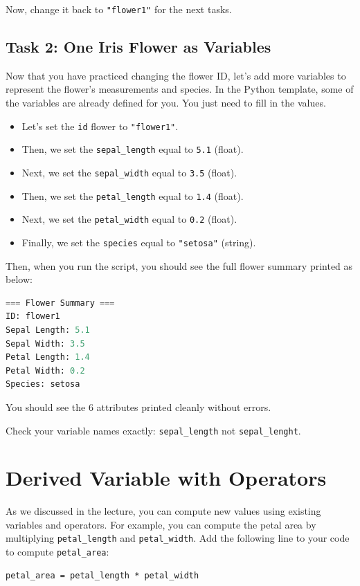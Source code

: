 Now, change it back to \texttt{"flower1"} for the next tasks.

\subsection{Task 2: One Iris Flower as Variables}
Now that you have practiced changing the flower ID, let's add more variables to represent the flower's measurements and species. In the Python template, some of the variables are already defined for you. You just need to fill in the values.
\begin{itemize}
    \item Let's set the \texttt{id} flower to \texttt{"flower1"}.
    \item Then, we set the \texttt{sepal\_length} equal to \texttt{5.1} (float).
    \item Next, we set the \texttt{sepal\_width} equal to \texttt{3.5} (float).
    \item Then, we set the \texttt{petal\_length} equal to \texttt{1.4} (float).
    \item Next, we set the \texttt{petal\_width} equal to \texttt{0.2} (float).
    \item Finally, we set the \texttt{species} equal to \texttt{"setosa"} (string).
\end{itemize}

Then, when you run the script, you should see the full flower summary printed as below:
\begin{lstlisting}[language=Python]
=== Flower Summary ===
ID: flower1
Sepal Length: 5.1
Sepal Width: 3.5
Petal Length: 1.4
Petal Width: 0.2
Species: setosa
\end{lstlisting}

\begin{tcolorbox}[title=Checkpoint]
You should see the 6 attributes printed cleanly without errors.
\end{tcolorbox}
\begin{tcolorbox}[title=Common Mistakes]
Check your variable names exactly: \texttt{sepal\_length} not \texttt{sepal\_lenght}.
\end{tcolorbox}

\section{Derived Variable with Operators}
As we discussed in the lecture, you can compute new values using existing variables and operators.
For example, you can compute the petal area by multiplying \texttt{petal\_length} and \texttt{petal\_width}.
Add the following line to your code to compute \texttt{petal\_area}:
\begin{verbatim}
petal_area = petal_length * petal_width
\end{verbatim}

